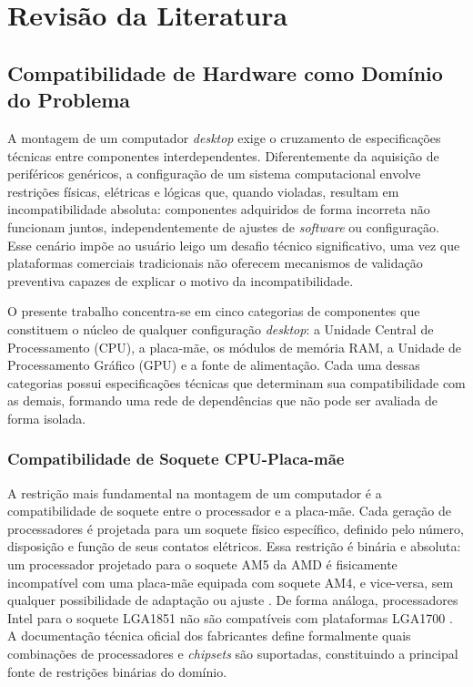 \chapter{Revisão da Literatura}
\label{cap:02}

\section{Compatibilidade de Hardware como Domínio do Problema}
\label{sec:compatibilidade-hardware}
A montagem de um computador \textit{desktop} exige o cruzamento de especificações técnicas entre componentes interdependentes.
Diferentemente da aquisição de periféricos genéricos, a configuração de um sistema computacional envolve restrições físicas, elétricas
e lógicas que, quando violadas, resultam em incompatibilidade absoluta: componentes adquiridos de forma incorreta não funcionam juntos,
independentemente de ajustes de \textit{software} ou configuração. Esse cenário impõe ao usuário leigo um desafio técnico significativo,
uma vez que plataformas comerciais tradicionais não oferecem mecanismos de validação preventiva capazes de explicar o motivo da incompatibilidade.

O presente trabalho concentra-se em cinco categorias de componentes que constituem o núcleo de qualquer configuração \textit{desktop}:
a Unidade Central de Processamento (CPU), a placa-mãe, os módulos de memória RAM, a Unidade de Processamento Gráfico (GPU) e a fonte de alimentação.
Cada uma dessas categorias possui especificações técnicas que determinam sua compatibilidade com as demais, formando uma rede de dependências
que não pode ser avaliada de forma isolada.

\subsection{Compatibilidade de Soquete CPU-Placa-mãe}
A restrição mais fundamental na montagem de um computador é a compatibilidade de soquete entre o processador e a placa-mãe.
Cada geração de processadores é projetada para um soquete físico específico, definido pelo número, disposição e função de seus contatos elétricos.
Essa restrição é binária e absoluta: um processador projetado para o soquete AM5 da AMD é fisicamente incompatível com uma placa-mãe
equipada com soquete AM4, e vice-versa, sem qualquer possibilidade de adaptação ou ajuste \cite{AMD2022}. De forma análoga, processadores Intel para o soquete LGA1851
não são compatíveis com plataformas LGA1700 \cite{INTEL2023}. A documentação técnica oficial dos fabricantes define formalmente quais
combinações de processadores e \textit{chipsets} são suportadas, constituindo a principal fonte de restrições binárias do domínio.

